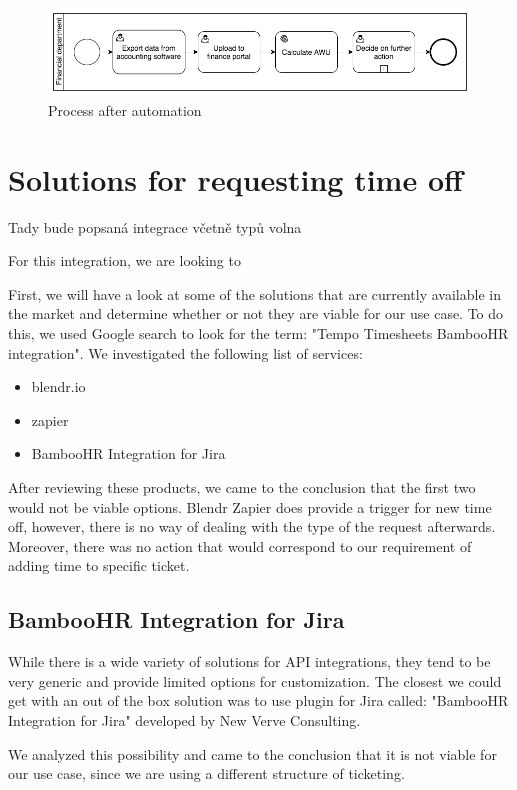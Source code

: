 \documentclass[12pt,oneside]{fithesis2}
\begin{document}
\begin{figure}[ht]
    \centering
    \includegraphics[width=\textwidth]{after_automation.png}
    \caption{Process after automation}
    \label{fig:after_automation}
\end{figure}

\section{Solutions for requesting time off}
Tady bude popsaná integrace včetně typů volna

For this integration, we are looking to 

First, we will have a look at some of the solutions that are currently available in the market and determine whether or not they are viable for our use case. To do this, we used Google search to look for the term: "Tempo Timesheets BambooHR integration". We investigated the following list of services:
\begin{itemize}
    \setlength\itemsep{0em}
    \item blendr.io 
    \item zapier
    \item BambooHR Integration for Jira
\end{itemize}
After reviewing these products, we came to the conclusion that the first two would not be viable options. Blendr \cite{blendr} Zapier does provide a trigger for new time off, however, there is no way of dealing with the type of the request afterwards. Moreover, there was no action that would correspond to our requirement of adding time to specific ticket.\cite{zapier}

\subsection*{BambooHR Integration for Jira}
While there is a wide variety of solutions for API integrations, they tend to be very generic and provide limited options for customization. The closest we could get with an out of the box solution was to use plugin for Jira called: "BambooHR Integration for Jira" developed by New Verve Consulting.

We analyzed this possibility and came to the conclusion that it is not viable for our use case, since we are using a different structure of ticketing.
\end{document}
